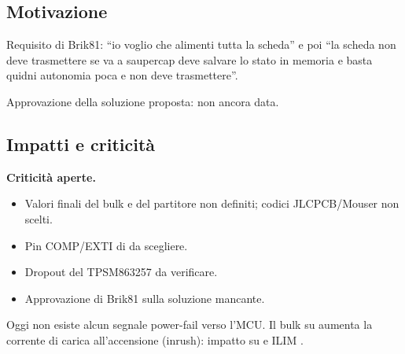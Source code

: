 \begin{center}
\end{center}

\subsection{Motivazione}
Requisito di Brik81: ``io voglio che alimenti tutta la scheda'' e poi ``la scheda non deve trasmettere se va a saupercap deve salvare lo stato in memoria e basta quidni autonomia poca e non deve trasmettere''.

Approvazione della soluzione proposta: non ancora data.

\subsection{Impatti e criticit\`a}
\begin{critbox}
\textbf{Criticit\`a aperte.}
\begin{itemize}[nosep]
  \item Valori finali del bulk e del partitore non definiti; codici JLCPCB/Mouser non scelti.
  \item Pin COMP/EXTI di  da scegliere.
  \item Dropout del TPSM863257 da verificare.
  \item Approvazione di Brik81 sulla soluzione mancante.
\end{itemize}
\end{critbox}
\begin{notebox}
Oggi non esiste alcun segnale power-fail verso l'MCU. Il bulk su  aumenta la corrente di carica all'accensione (inrush): impatto su  e ILIM .
\end{notebox}

